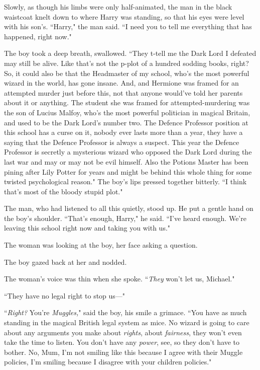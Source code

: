 Slowly, as though his limbs were only half-animated, the man in the black waistcoat knelt down to where Harry was standing, so that his eyes were level with his son's. ``Harry," the man said. ``I need you to tell me everything that has happened, right now."

The boy took a deep breath, swallowed. ``They t-tell me the Dark Lord I defeated may still be alive. Like that's not the p-plot of a hundred sodding books, right? So, it could also be that the Headmaster of my school, who's the most powerful wizard in the world, has gone insane. And, and Hermione was framed for an attempted murder just before this, not that anyone would've told her parents about it or anything. The student she was framed for attempted-murdering was the son of Lucius Malfoy, who's the most powerful politician in magical Britain, and used to be the Dark Lord's number two. The Defence Professor position at this school has a curse on it, nobody ever lasts more than a year, they have a saying that the Defence Professor is always a suspect. This year the Defence Professor is secretly a mysterious wizard who opposed the Dark Lord during the last war and may or may not be evil himself. Also the Potions Master has been pining after Lily Potter for years and might be behind this whole thing for some twisted psychological reason." The boy's lips pressed together bitterly. ``I think that's most of the bloody stupid plot."

The man, who had listened to all this quietly, stood up. He put a gentle hand on the boy's shoulder. ``That's enough, Harry," he said. ``I've heard enough. We're leaving this school right now and taking you with us."

The woman was looking at the boy, her face asking a question.

The boy gazed back at her and nodded.

The woman's voice was thin when she spoke. ``\emph{They} won't let us, Michael."

``They have no legal right to stop us—"

``\emph{Right?} You're \emph{Muggles,}" said the boy, his smile a grimace. ``You have as much standing in the magical British legal system as mice. No wizard is going to care about any arguments you make about \emph{rights}, about \emph{fairness}, they won't even take the time to listen. You don't have any \emph{power}, see, so they don't have to bother. No, Mum, I'm not smiling like this because I agree with their Muggle policies, I'm smiling because I disagree with your children policies."

